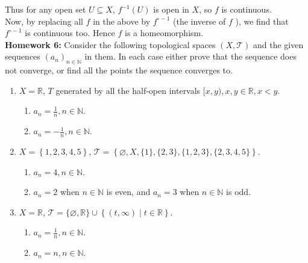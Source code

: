 \documentclass[a4paper]{article}
\begin{document}
        Thus for any open set $U \subseteq X$, $f^{-1}(U)$ is open in $X$, so
        $f$ is continuous.
        \\
        Now, by replacing all $f$ in the above by $f^{\circ -1}$ (the inverse
        of $f$ ), we find that
        $f^{\circ -1}$ is continuous too. Hence $f$ is a homeomorphism.\\
        \linebreak
        \textbf{Homework 6:} Consider the following topological spaces
        $(X, \mathcal{T})$ and the given sequences $\left( a_n \right)_{n \in
        \mathbb{N}}$ in them. In each case either prove that the sequence does
        not converge, or find all the points the sequence converges to.\\
        \begin{enumerate}[label=(\roman*)]
            \item $X = \mathbb{R}$, $T$ generated by all the half-open
                intervals $[x,y), x,y \in \mathbb{R}, x < y$.
                \begin{enumerate}
                    \item $a_{n} = \frac{1}{n}, n \in \mathbb{N}$.
                    \item $a_n = -\frac{1}{n}, n \in \mathbb{N}$.   
                \end{enumerate}
            \item $X = \left\{ 1,2,3,4,5 \right\} $, $\mathcal{T}=
                \left\{ \varnothing, X, \{1\}, \{2,3\}, \{1,2,3\}, \{2,3,4,5\}
                \right\} $.
                \begin{enumerate}
                    \item $a_n = 4, n \in \mathbb{N}$.
                    \item $a_n = 2$ when $n \in \mathbb{N}$ is even, and
                        $a_n = 3$ when $n \in \mathbb{N}$ is odd.
                \end{enumerate}
            \item $X = \mathbb{R}$, $\mathcal{T} = \{\varnothing, \mathbb{R}\}
                \cup \left\{ (t,\infty)  \mid t \in \mathbb{R} \right\} $.
                \begin{enumerate}
                    \item $a_n = \frac{1}{n}, n \in \mathbb{N}$.
                    \item $a_n = n, n \in \mathbb{N}$.
                \end{enumerate}
        \end{enumerate}
\end{document}

